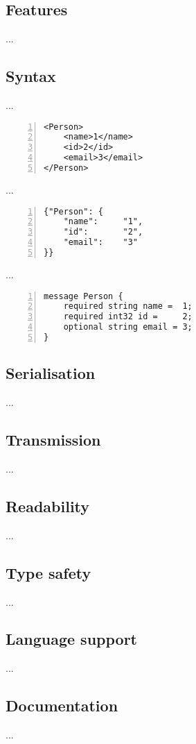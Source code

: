 \documentclass[../report.tex]{subfiles}
\begin{document}
\subsection{Features}

...

\subsection{Syntax}

... \\

\begin{Verbatim}[frame=single,numbers=left,framesep=5mm,label=XML Object]
<Person>
    <name>1</name>
    <id>2</id>
    <email>3</email>
</Person>
\end{Verbatim}

... \\

\begin{Verbatim}[frame=single,numbers=left,framesep=5mm,label=JSON Object]
{"Person": {
    "name":     "1",
    "id":       "2",
    "email":    "3"
}}
\end{Verbatim}

... \\

\begin{Verbatim}[frame=single,numbers=left,framesep=5mm,label=Proto Object]
message Person {
    required string name =  1;
    required int32 id =     2;
    optional string email = 3;
}
\end{Verbatim}

\subsection{Serialisation}

...

\subsection{Transmission}

...

\subsection{Readability}

...

\subsection{Type safety}

...

\subsection{Language support}

...

\subsection{Documentation}

...
\end{document}
